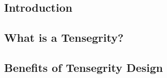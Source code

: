 \subsection{Introduction}



\subsection{What is a Tensegrity?}



\subsection{Benefits of Tensegrity Design}
